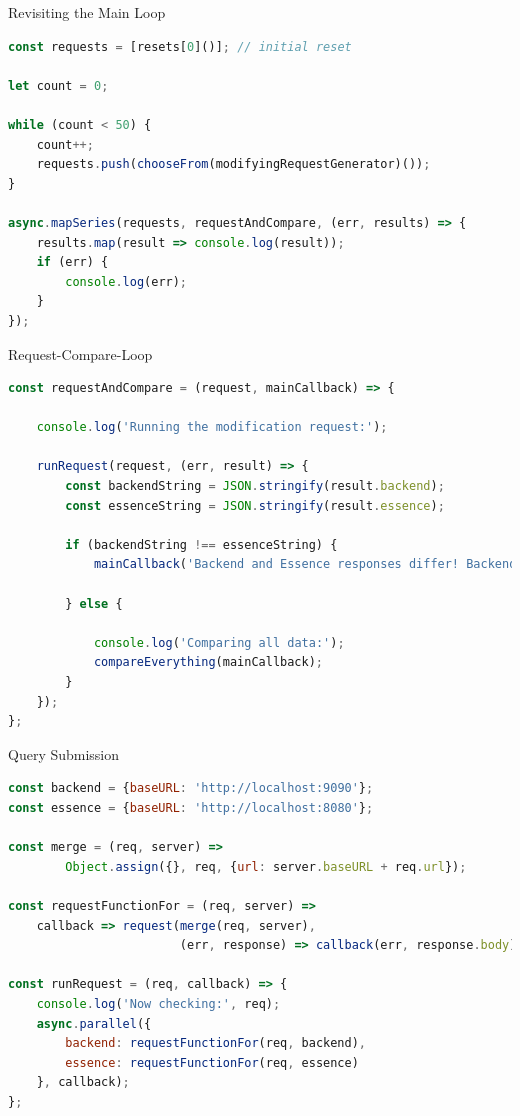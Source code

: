 \begin{frame}[fragile]{Revisiting the Main Loop}

\begin{lstlisting}[language=JavaScript]
const requests = [resets[0]()]; // initial reset

let count = 0;

while (count < 50) {
    count++;
    requests.push(chooseFrom(modifyingRequestGenerator)());
}

async.mapSeries(requests, requestAndCompare, (err, results) => {
    results.map(result => console.log(result));
    if (err) {
        console.log(err);
    }
});
\end{lstlisting}

\end{frame}

\begin{frame}[fragile]{Request-Compare-Loop}

\begin{lstlisting}[language=JavaScript]
const requestAndCompare = (request, mainCallback) => {

    console.log('Running the modification request:');

    runRequest(request, (err, result) => {
        const backendString = JSON.stringify(result.backend);
        const essenceString = JSON.stringify(result.essence);
        
        if (backendString !== essenceString) {
            mainCallback('Backend and Essence responses differ! Backend: ' + backendString + ' - Essence: ' + essenceString);
            
        } else {
            
            console.log('Comparing all data:');
            compareEverything(mainCallback);
        }
    });
};
\end{lstlisting}

\end{frame}


\begin{frame}[fragile]{Query Submission}

\begin{lstlisting}[language=JavaScript]
const backend = {baseURL: 'http://localhost:9090'};
const essence = {baseURL: 'http://localhost:8080'};

const merge = (req, server) => 
        Object.assign({}, req, {url: server.baseURL + req.url});

const requestFunctionFor = (req, server) =>
    callback => request(merge(req, server), 
                        (err, response) => callback(err, response.body));

const runRequest = (req, callback) => {
    console.log('Now checking:', req);
    async.parallel({
        backend: requestFunctionFor(req, backend),
        essence: requestFunctionFor(req, essence)
    }, callback);
};
\end{lstlisting}

\end{frame}

